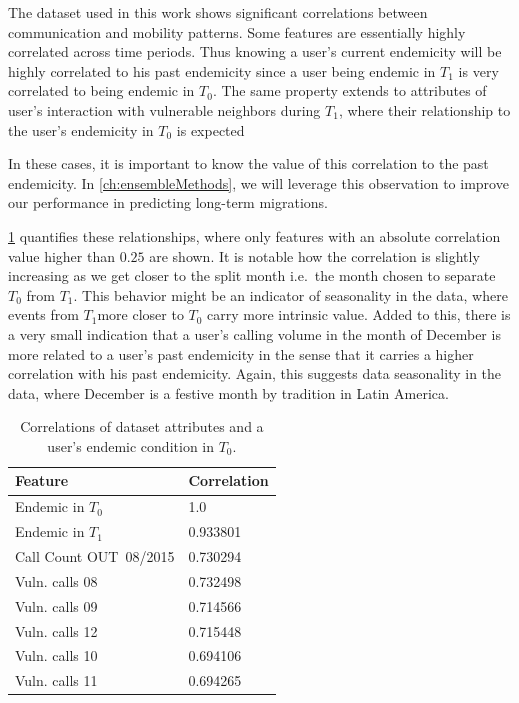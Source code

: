 The dataset used in this work shows significant correlations between communication and mobility patterns.
Some features are essentially highly correlated across time periods.
Thus knowing a user's current endemicity will be highly correlated to his past endemicity since a user being endemic in $T_1$ is very correlated to being endemic in $T_0$.
The same property extends to attributes of user's interaction with vulnerable neighbors during $T_1$, where their relationship to the user's endemicity in $T_0$ is expected

In these cases, it is important to know the value of this correlation to the past endemicity.
In \cref{ch:ensembleMethods}, we will leverage this observation to improve our performance in predicting long-term migrations.

\cref{tab:featureCorrelations} quantifies these relationships, where only features with an absolute correlation value higher than $0.25$ are shown.
It is notable how the correlation is slightly increasing as we get closer to the split month i.e.\ the month chosen to separate $T_0$ from $T_1$.
This behavior might be an indicator of seasonality in the data, where events from $T_1$more closer to $T_0$ carry more intrinsic value.
Added to this, there is a very small indication that a user's calling volume in the month of December is more related to a user's past endemicity in the sense that it carries a higher correlation with his past endemicity.
Again, this suggests data seasonality in the data, where December is a festive month by tradition in Latin America.


\begin{table}
	\caption{Correlations of dataset attributes and a user's endemic condition in $T_0$.}
	\label{tab:featureCorrelations}
	\centering
	\begin{tabular}{l l }
		\toprule
		Feature & Correlation \\
		\midrule
		Endemic in $T_0$        & 1.0 \\
		Endemic in $T_1$        & 0.933801 \\
		Call Count  OUT\ 08/2015  & 0.730294 \\ %
		Vuln. calls  08 &0.732498 \\
		Vuln. calls  09   &0.714566 \\
		Vuln. calls 12  &0.715448 \\
		Vuln. calls  10  &0.694106 \\
		Vuln. calls  11   &0.694265 \\
		\bottomrule
	\end{tabular}
\end{table}


